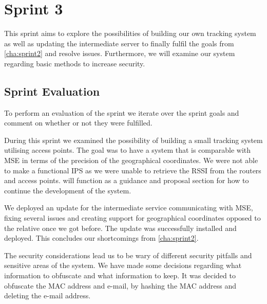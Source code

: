 \chapter{Sprint 3}\label{cha:sprint3}
This sprint aims to explore the possibilities of building our own tracking system as well as updating the intermediate server to finally fulfil the goals from \cref{cha:sprint2} and resolve issues. Furthermore, we will examine our system regarding basic methods to increase security.





\section{Sprint Evaluation}
To perform an evaluation of the sprint we iterate over the sprint goals and comment on whether or not they were fulfilled.

During this sprint we examined the possibility of building a small tracking system utilising access points. The goal was to have a system that is comparable with MSE in terms of the precision of the geographical coordinates. We were not able to make a functional IPS as we were unable to retrieve the RSSI from the routers and access points.  will function as a guidance and proposal section for how to continue the development of the system.

We deployed an update for the intermediate service communicating with MSE, fixing several issues and creating support for geographical coordinates opposed to the relative once we got before. The update was successfully installed and deployed. This concludes our shortcomings from \cref{cha:sprint2}.

The security considerations lead us to be wary of different security pitfalls and sensitive areas of the system. We have made some decisions regarding what information to obfuscate and what information to keep. It was decided to obfuscate the MAC address and e-mail, by hashing the MAC address and deleting the e-mail address.